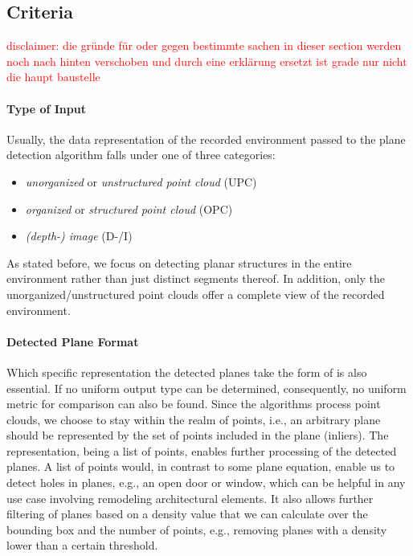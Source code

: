 \documentclass[main.tex]{subfiles}
\begin{document}
\subsection{Criteria}
\textcolor{red}{disclaimer: die gründe für oder gegen bestimmte sachen in dieser section werden noch nach hinten verschoben und durch eine erklärung ersetzt ist grade nur nicht die haupt baustelle}
\paragraph{Type of Input}\label{par:input}
Usually, the data representation of the recorded environment passed to the plane detection algorithm falls under one of three categories:
\begin{itemize}
    \item \textit{unorganized} or \textit{unstructured point cloud} (UPC)
    \item \textit{organized} or \textit{structured point cloud} (OPC)
    \item \textit{(depth-) image} (D-/I)
\end{itemize}

As stated before, we focus on detecting planar structures in the entire environment rather than just distinct segments thereof.
In addition, only the unorganized/unstructured point clouds offer a complete view of the recorded environment.


\paragraph{Detected Plane Format} \label{subsec:planeformat}
Which specific representation the detected planes take the form of is also essential.
If no uniform output type can be determined, consequently, no uniform metric for comparison can also be found.
Since the algorithms process point clouds, we choose to stay within the realm of points, i.e., an arbitrary plane should be
represented by the set of points included in the plane (inliers).
The representation, being a list of points, enables further processing of the detected planes.
A list of points would, in contrast to some plane equation, enable us to detect holes in planes, e.g.,
an open door or window, which can be helpful in any use case involving remodeling architectural elements.
It also allows further filtering of planes based on a density value that we can calculate over the bounding
box and the number of points, e.g., removing planes with a density lower than a certain threshold.
\end{document}
